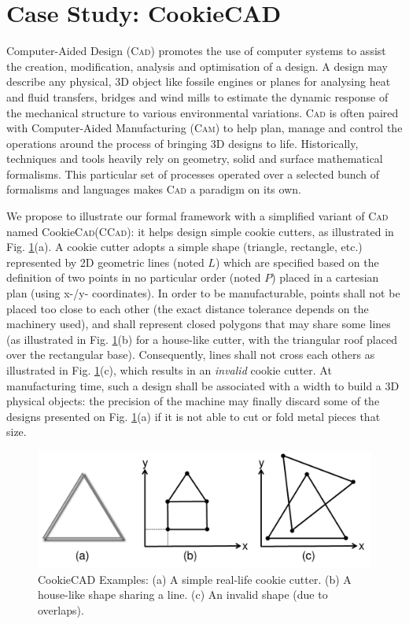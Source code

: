 \section{Case Study: CookieCAD}
\label{sec:CS}

Computer-Aided Design (\textsc{Cad}) \cite{B:Groover-Zimmers:2008} promotes the 
use of computer systems to assist the creation, modification, analysis and 
optimisation of a design. 
A design may describe any physical, 3D object like fossile engines or planes 
for analysing heat and fluid transfers, bridges and wind mills to estimate the 
dynamic response of the mechanical structure to various environmental 
variations. \textsc{Cad} is often paired with Computer-Aided Manufacturing 
(\textsc{Cam}) to help plan, manage and control the operations around the 
process of bringing 3D designs to life. Historically, techniques and tools 
heavily rely on geometry, solid and surface mathematical formalisms. This 
particular set of processes operated over a selected bunch of formalisms and 
languages makes \textsc{Cad} a paradigm on its own. 

We propose to illustrate our formal framework with a simplified variant of 
\textsc{Cad} named Cookie\textsc{Cad}(\textsc{CCad}): it helps design simple 
cookie cutters, as illustrated in Fig. \ref{fig:CookieCAD}(a). A cookie cutter 
adopts a simple shape (triangle, rectangle, etc.) represented by 2D geometric 
lines (noted $L$) which are specified based on the definition of two points in 
no particular order (noted $P$) placed in a cartesian plan (using x-/y- 
coordinates). In order to be manufacturable, points shall not be placed too 
close to each other (the exact distance tolerance depends on the machinery 
used), and shall represent closed polygons that may share some lines (as 
illustrated in Fig. \ref{fig:CookieCAD}(b) for a house-like cutter, with the 
triangular roof placed over the rectangular base). Consequently, lines shall not 
cross each others as illustrated in Fig. \ref{fig:CookieCAD}(c), which results 
in an \emph{invalid} cookie cutter. At manufacturing time, such a design shall 
be associated with a width to build a 3D physical objects: the precision of the 
machine may finally discard some of the designs presented on Fig. 
\ref{fig:CookieCAD}(a) if it is not able to cut or fold metal pieces that size.

\begin{figure}[t]
   \centering
   \includegraphics[width=\columnwidth]{CookieCAD.pdf}
   \caption{CookieCAD Examples: (a) A simple real-life cookie cutter. (b) A 
house-like shape sharing a line. (c) An invalid shape (due to overlaps).}%
   \label{fig:CookieCAD}
\end{figure}

